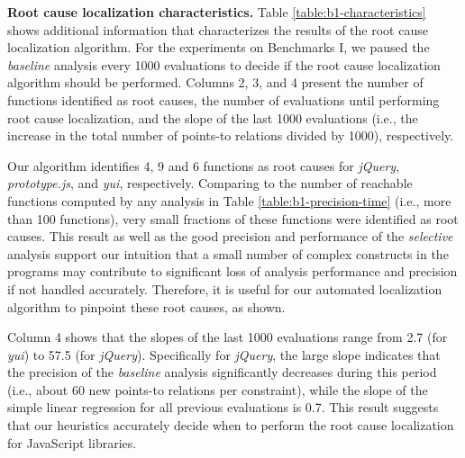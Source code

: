 {\bf Root cause localization characteristics.} Table \ref{table:b1-characteristics} shows additional information that characterizes the results of the root cause localization algorithm. For the experiments on Benchmarks I, we paused the {\it baseline} analysis every 1000 evaluations to decide if the root cause localization algorithm should be performed. Columns 2, 3, and 4 present the number of functions identified as root causes, the number of evaluations until performing root cause localization, and the slope of the last 1000 evaluations (i.e., the increase in the total number of points-to relations divided by 1000), respectively. 

Our algorithm identifies 4, 9 and 6 functions as root causes for {\it jQuery}, {\it prototype.js}, and {\it yui}, respectively. Comparing to the number of reachable functions computed by any analysis in Table \ref{table:b1-precision-time} (i.e., more than 100 functions), very small fractions of these functions were identified as root causes. This result as well as the good precision and performance of the {\it selective} analysis support our intuition that a small number of complex constructs in the programs may contribute to significant loss of analysis performance and precision if not handled accurately. Therefore, it is useful for our automated localization algorithm to pinpoint these root causes, as shown.

Column 4 shows that the slopes of the last 1000 evaluations range from 2.7 (for {\it yui}) to 57.5 (for {\it jQuery}). Specifically for {\it jQuery}, the large slope indicates that the precision of the {\it baseline} analysis significantly decreases during this period (i.e., about 60 new points-to relations per constraint), while the slope of the simple linear regression for all previous evaluations is 0.7. This result suggests that our heuristics accurately decide when to perform the root cause localization for JavaScript libraries.



